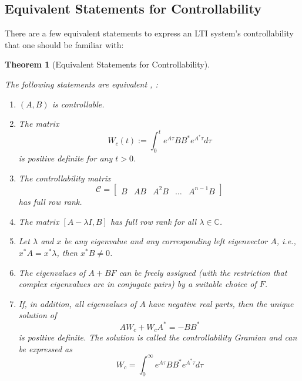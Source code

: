 \documentclass[
]{book}
\newtheorem{theorem}{Theorem}[chapter]
\theoremstyle{definition}
\theoremstyle{definition}
\theoremstyle{definition}
\theoremstyle{definition}
\theoremstyle{remark}
\begin{document}
\hypertarget{equivalent-statements-for-controllability}{%
\subsection{Equivalent Statements for Controllability}\label{equivalent-statements-for-controllability}}

There are a few equivalent statements to express an LTI system's controllability that one should be familiar with:

\begin{theorem}[Equivalent Statements for Controllability]
\protect\hypertarget{thm:lticontrollable}{}\label{thm:lticontrollable}

The following statements are equivalent \citep{chen1984book-linear}, \citep{zhou1996book-robust}:

\begin{enumerate}
\def\labelenumi{\arabic{enumi}.}
\item
  \((A, B)\) is controllable.
\item
  The matrix
  \[
  W_c(t) := \int_{0}^{t} e^{A\tau} B B^* e^{A^* \tau} d\tau
  \]
  is positive definite for any \(t > 0\).
\item
  The controllability matrix
  \[
  \mathcal{C} = \begin{bmatrix}
     B & AB & A^2 B & \dots & A^{n-1} B 
  \end{bmatrix}
  \]
  has full row rank.
\item
  The matrix \([A - \lambda I, B]\) has full row rank for all \(\lambda \in \mathbb{C}\).
\item
  Let \(\lambda\) and \(x\) be any eigenvalue and any corresponding left eigenvector \(A\), i.e., \(x^* A = x^* \lambda\), then \(x^* B \ne 0\).
\item
  The eigenvalues of \(A+BF\) can be freely assigned (with the restriction that complex eigenvalues are in conjugate pairs) by a suitable choice of \(F\).
\item
  If, in addition, all eigenvalues of \(A\) have negative real parts, then the unique solution of
  \[ 
  A W_c + W_c A^* = -B B^* 
  \]
  is positive definite. The solution is called the \emph{controllability Gramian} and can be expressed as
  \[
  W_c = \int_{0}^{\infty} e^{A \tau} B B^* e^{A^* \tau} d\tau
  \]
\end{enumerate}

\end{theorem}
\end{document}
